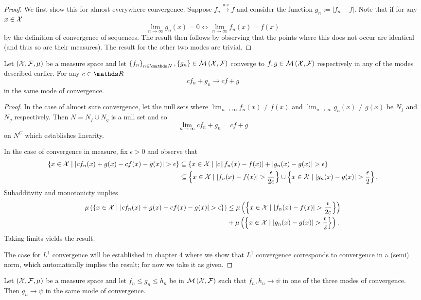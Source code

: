 \begin{proof}
We first show this for almost everywhere convergence. Suppose $f_{n}\stackrel{\text{a.e}}{\longrightarrow}f$
and consider the function $g_{n}:=\lvert f_{n}-f\rvert$. Note that
if for any $x\in\mathcal{X}$
\[
\lim_{n\to\infty}g_{n}(x)=0\Longleftrightarrow\lim_{n\to\infty}f_{n}(x)=f(x)
\]
by the definition of convergence of sequences. The result then follows
by observing that the points where this does not occur are identical
(and thus so are their measures). The result for the other two modes
are trivial.
\end{proof}
\begin{prop}
\label{prop:linearityConvergence}Let $(\mathcal{X},\mathcal{F},\mu)$ be a measure
space and let $\left\{ f_{n}\right\} _{n\in\N},\left\{ g_{n}\right\} \in\measurableFunctions$
converge to $f,g\in\mathcal{M}\left(\mathcal{X},\mathcal{F}\right)$ respectively in any of the
modes described earlier. For any $c\in\R$
\[
cf_{n}+g_{n}\to cf+g
\]
in the same mode of convergence.
\end{prop}

\begin{proof}
In the case of almost sure convergence, let the null sets where $\lim_{n\to\infty}f_{n}(x)\neq f(x)$
and $\lim_{n\to\infty}g_{n}(x)\neq g(x)$ be $N_{f}$ and $N_{g}$
respectively. Then $N=N_{f}\cup N_{g}$ is a null set and so
\[
\lim_{n\to\infty}cf_{n}+g_{n}=cf+g
\]
on $N^{C}$ which establishes linearity.

In the case of convergence in measure, fix $\epsilon>0$ and observe
that 
\begin{align*}
\left\{ x\in\mathcal{X}\mid\lvert cf_{n}(x)+g(x)-cf(x)-g(x)\rvert>\epsilon\right\}  & \subseteq\left\{ x\in\mathcal{X}\mid\lvert c\rvert\lvert f_{n}(x)-f(x)\rvert+\lvert g_{n}(x)-g(x)\rvert>\epsilon\right\} \\
 & \subseteq\left\{ x\in\mathcal{X}\mid\lvert f_{n}(x)-f(x)\rvert>\frac{\epsilon}{2c}\right\} \cup\left\{ x\in\mathcal{X}\mid\lvert g_{n}(x)-g(x)\rvert>\frac{\epsilon}{2}\right\} .
\end{align*}
Subadditvity and monotonicty implies
\begin{align*}
\mu\left(\left\{ x\in\mathcal{X}\mid\lvert cf_{n}(x)+g(x)-cf(x)-g(x)\rvert>\epsilon\right\} \right) & \leq\mu\left(\left\{ x\in\mathcal{X}\mid\lvert f_{n}(x)-f(x)\rvert>\frac{\epsilon}{2c}\right\} \right)\\
 & +\mu\left(\left\{ x\in\mathcal{X}\mid\lvert g_{n}(x)-g(x)\rvert>\frac{\epsilon}{2}\right\} \right).
\end{align*}
Taking limits yields the result.

The case for $L^{1}$ convergence will be established in chapter 4
where we show that $L^{1}$ convergence corresponds to convergence
in a (semi) norm, which automatically implies the result; for now
we take it as given.
\end{proof}
\begin{prop}
\label{prop:squeezeThm}Let $\left(\mathcal{X},\mathcal{F},\mu\right)$ be a measure
space and let $f_{n}\leq g_{n}\leq h_{n}$ be in $\mathcal{M}\left(\mathcal{X},\mathcal{F}\right)$
such that $f_{n},h_{n}\to\psi$ in one of the three modes of convergence.
Then $g_{n}\to\psi$ in the same mode of convergence.
\end{prop}

